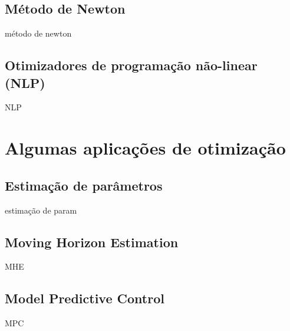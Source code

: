 \subsection{Método de Newton}

método de newton

\subsection{Otimizadores de programação não-linear (NLP)}

NLP

\section{Algumas aplicações de otimização}

\subsection{Estimação de parâmetros}

estimação de param

\subsection{Moving Horizon Estimation}

MHE

\subsection{Model Predictive Control}

MPC